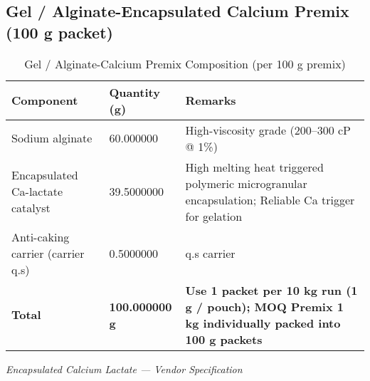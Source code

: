 \subsection*{Gel / Alginate-Encapsulated Calcium Premix (100 g packet)}

\begin{table}[h]
\caption{Gel / Alginate-Calcium Premix Composition (per 100 g premix)}
\label{tab:alginate_gel}
\begin{tabular}{@{}lll@{}}
\toprule
\textbf{Component} & \textbf{Quantity (g)} & \textbf{Remarks} \\
\midrule
Sodium alginate & 60.000000 & High-viscosity grade (200--300 cP @ 1\%) \\
Encapsulated Ca-lactate catalyst & 39.5000000 & High melting heat triggered polymeric microgranular encapsulation; Reliable Ca trigger for gelation \\
Anti-caking carrier (carrier q.s) & 0.5000000 & q.s carrier \\
\midrule
\textbf{Total} & \textbf{100.000000 g} & \textbf{Use 1 packet per 10 kg run (1 g / pouch); MOQ Premix 1 kg individually packed into 100 g packets} \\
\bottomrule
\end{tabular}
\end{table}
\vspace{0.5em}

\textit{Encapsulated Calcium Lactate — Vendor Specification}

